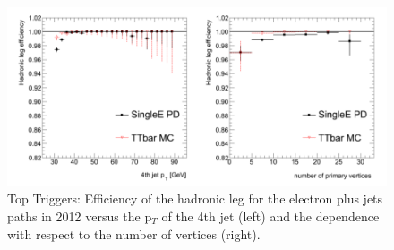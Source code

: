 \begin{figure} \label{fig-SemiLeptEfficiencies}
\includegraphics[width=\textwidth]{Figures/SemiLeptTriggerEfficiencies.png}
\caption{Top Triggers: Efficiency of the hadronic leg for the electron plus jets paths in 2012 versus the p$_T$ of the 4th jet (left) and the dependence with respect to the number of vertices (right). \cite{CMSTriggerPerformance}}
\end{figure}
